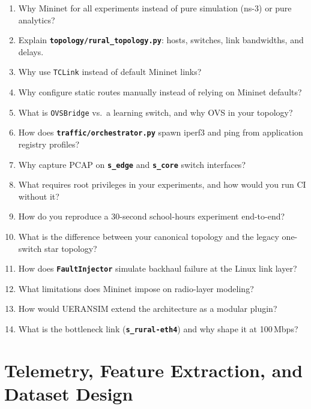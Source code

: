 \documentclass[11pt,a4paper]{article}
\newcommand{\proj}[1]{\textbf{\texttt{#1}}}
\begin{document}
\begin{enumerate}
    \item Why Mininet for all experiments instead of pure simulation (ns-3) or pure analytics?
    \item Explain \proj{topology/rural\_topology.py}: hosts, switches, link bandwidths, and delays.
    \item Why use \texttt{TCLink} instead of default Mininet links?
    \item Why configure static routes manually instead of relying on Mininet defaults?
    \item What is \texttt{OVSBridge} vs.\ a learning switch, and why OVS in your topology?
    \item How does \proj{traffic/orchestrator.py} spawn iperf3 and ping from application registry profiles?
    \item Why capture PCAP on \proj{s\_edge} and \proj{s\_core} switch interfaces?
    \item What requires root privileges in your experiments, and how would you run CI without it?
    \item How do you reproduce a 30-second school-hours experiment end-to-end?
    \item What is the difference between your canonical topology and the legacy one-switch star topology?
    \item How does \proj{FaultInjector} simulate backhaul failure at the Linux link layer?
    \item What limitations does Mininet impose on radio-layer modeling?
    \item How would UERANSIM extend the architecture as a modular plugin?
    \item What is the bottleneck link (\proj{s\_rural-eth4}) and why shape it at 100\,Mbps?
\end{enumerate}

\section{Telemetry, Feature Extraction, and Dataset Design}
\end{document}
